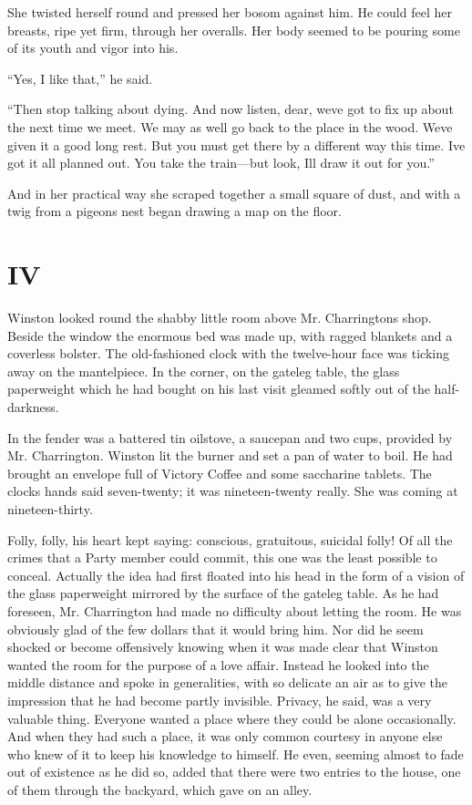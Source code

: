 She twisted herself round and pressed her bosom against him. He could
feel her breasts, ripe yet firm, through her overalls. Her body seemed
to be pouring some of its youth and vigor into his.

``Yes, I like that,'' he said.

``Then stop talking about dying. And now listen, dear,
we\textquotesingle ve got to fix up about the next time we meet. We may
as well go back to the place in the wood. We\textquotesingle ve given it
a good long rest. But you must get there by a different way this time.
I\textquotesingle ve got it all planned out. You take the train---but
look, I\textquotesingle ll draw it out for you.''

And in her practical way she scraped together a small square of dust,
and with a twig from a pigeon\textquotesingle s nest began drawing a map
on the floor.


\section{IV}\label{iv-1}

Winston looked round the shabby little room above Mr.
Charrington\textquotesingle s shop. Beside the window the enormous bed
was made up, with ragged blankets and a coverless bolster. The
old-fashioned clock with the twelve-hour face was ticking away on the
mantelpiece. In the corner, on the gateleg table, the glass paperweight
which he had bought on his last visit gleamed softly out of the
half-darkness.

In the fender was a battered tin oilstove, a saucepan and two cups,
provided by Mr. Charrington. Winston lit the burner and set a pan of
water to boil. He had brought an envelope full of Victory Coffee and
some saccharine tablets. The clock\textquotesingle s hands said
seven-twenty; it was nineteen-twenty really. She was coming at
nineteen-thirty.

Folly, folly, his heart kept saying: conscious, gratuitous, suicidal
folly! Of all the crimes that a Party member could commit, this one was
the least possible to conceal. Actually the idea had first floated into
his head in the form of a vision of the glass paperweight mirrored by
the surface of the gateleg table. As he had foreseen, Mr. Charrington
had made no difficulty about letting the room. He was obviously glad of
the few dollars that it would bring him. Nor did he seem shocked or
become offensively knowing when it was made clear that Winston wanted
the room for the purpose of a love affair. Instead he looked into the
middle distance and spoke in generalities, with so delicate an air as to
give the impression that he had become partly invisible. Privacy, he
said, was a very valuable thing. Everyone wanted a place where they
could be alone occasionally. And when they had such a place, it was only
common courtesy in anyone else who knew of it to keep his knowledge to
himself. He even, seeming almost to fade out of existence as he did so,
added that there were two entries to the house, one of them through the
backyard, which gave on an alley.

